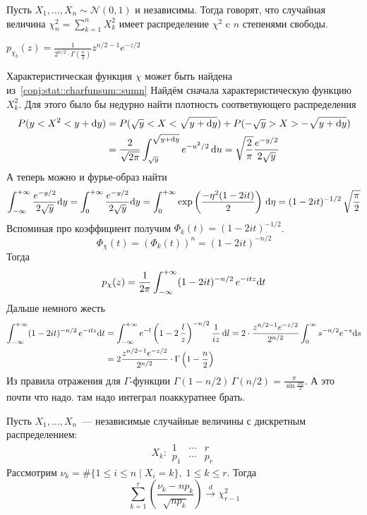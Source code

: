 \documentclass[12pt,ebook]{../../../notes}
\begin{document}
\begin{defn}\label{defn:stat::genmuavr::chi}
  Пусть $X_1, \dotsc, X_n \sim \mathcal N (0,1)$ и независимы. Тогда говорят, что случайная
  величина $\displaystyle \chi_n^2 = \sum_{k=1}^n X_k^2$ имеет распределение $\chi^2$ c $n$
  степенями свободы.
\end{defn}
\begin{prop}\label{prop:stat::genmuavr::chi}
  $\displaystyle p_{\chi_b}(z) = \frac{1}{2^{n/2}\cdot \Gamma (\frac{n}{2} )} z^{n/2 -1} e^{-z/2} $
\end{prop}
\begin{itlproof}
  Характеристическая функция $\chi$ может быть найдена из~\ref{conj:stat::charfunsum::sumn}
  Найдём сначала характеристическую функцию $X_k^2$. Для этого было бы недурно найти плотность
  соответвующего распределения
  \[
    \begin{split}
      P(y < X^2 < y+ \mathrm{d} y) &= P(\sqrt y < X < \sqrt{y + \mathrm{d} y})+ P(-\sqrt y>X >-\sqrt{y+\mathrm{d} y})
      \\
      &= \frac{2}{\sqrt{2\pi}}  \int_{\sqrt y}^{\sqrt{y+\mathrm{d} y}} e^{-u^2/2} \, \mathrm{d} u 
      = \sqrt{\frac{2}{\pi} } \frac{e^{-y/2}}{2\sqrt y} 
    \end{split}
  \]
  А теперь можно и фурье-образ найти
  \[
    \int_{-\infty}^{+\infty}\frac{e^{-y/2}}{2\sqrt y}\mathrm{d} y = \int_{0}^{+\infty}\frac{e^{-y/2}}{2\sqrt y}\mathrm{d} y
    = \int_{0}^{+\infty} \exp\left(\frac{-\eta^2(1-2it)}{2}\right)\,\mathrm{d}\eta
    = (1-2it)^{-1/2} \, \sqrt{\frac\pi 2}
  \]
  Вспоминая про коэффициент получим $\Phi_k(t) = (1-2it)^{-1/2}$.
  \[
    \Phi_\chi(t) = \left(\Phi_k(t)\right)^n =  (1-2it)^{-n/2}
  \]
  Тогда \[
    p_\chi(z) = \frac{1}{2\pi} \int_{-\infty}^{+\infty} (1-2it)^{-n/2}\, e^{-itz}\mathrm{d} t
  \]
  Дальше немного жесть
  \begin{align*}
    \int_{-\infty}^{+\infty} (1-2it)^{-n/2}\, e^{-itz}\mathrm{d} t &= \int_{-\infty}^{+\infty} e^{-l} \left(1-2\, \frac{l}{z} \right)^{-n/2}
    \frac{1}{iz} \, \mathrm{d} l 
    = 2\cdot\frac{z^{n/2-1} e^{-z/2}}{2^{n/2}} \int_{0}^{\infty} s^{-n/2} e^{-s} \mathrm{d} s \\
    &= 2\frac{z^{n/2-1} e^{-z/2}}{2^{n/2}} \cdot \Gamma\left(1-\frac{n}{2} \right)
  \end{align*}
  Из правила отражения для $\Gamma$-функции 
  $\Gamma(1-n/2)\, \Gamma(n/2) = \frac{\pi}{\sin\frac{\pi n}{2} } $. А это почти что надо.
  \underdev
  там надо интеграл поаккуратнее брать.
\end{itlproof}

\begin{thrm}\label{thrm:stat::genmuavr}
  Пусть $X_1, \dotsc, X_n$~--- независимые случайные величины с дискретным распределением:
  \[
    X_k \colon
    \begin{array}{c|c|c}
      1 & \cdots & r \\ \hline
      p_1 & \cdots & p_r
    \end{array}
  \]
  Рассмотрим $\nu_k = \# \{ 1 \leqslant i \leqslant n \mid X_i =k\},\; 1\leqslant k \leqslant r$.
  Тогда 
  \[
    \sum_{k=1}^r \left( \frac{\nu_k - n p_k}{\sqrt{n p_k}}  \right) \xrightarrow{d} \chi_{r-1}^2
  \]
\end{thrm}
\end{document}

